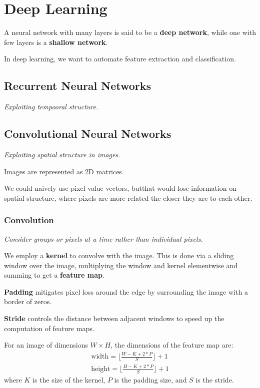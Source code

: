 \section{Deep Learning}
A neural network with many layers is said to be a \textbf{deep network},
while one with few layers is a \textbf{shallow network}.

In deep learning, we want to automate feature extraction and classification.

\subsection{Recurrent Neural Networks}
\emph{Exploiting tempooral structure.}

\subsection{Convolutional Neural Networks}
\emph{Exploiting spatial structure in images.}

Images are represented as 2D matrices.

We could naively use pixel value vectors, butthat would lose information on spatial structure, where pixels are more related the
closer they are to each other.

\subsubsection{Convolution}
\emph{Consider groups or pixels at a time rather than individual pixels.}

We employ a \textbf{kernel} to convolve with the image.
This is done via a sliding window over the image, multiplying the window and kernel
elementwise and summing to get a \textbf{feature map}.

\textbf{Padding} mitigates pixel loss around the edge by surrounding the image with
a border of zeros.

\textbf{Stride} controls the distance between adjacent windows to speed up the
computation of feature maps.

For an image of dimensions $W \times H$, the dimensions of the feature map are:
\begin{align*}
    \text{width} = \lfloor \frac{W - K + 2*P}{S} \rfloor + 1 \\
    \text{height} = \lfloor \frac{H - K + 2*P}{S} \rfloor + 1
\end{align*}
where $K$ is the size of the kernel, $P$ is the padding size, and $S$ is the stride.

